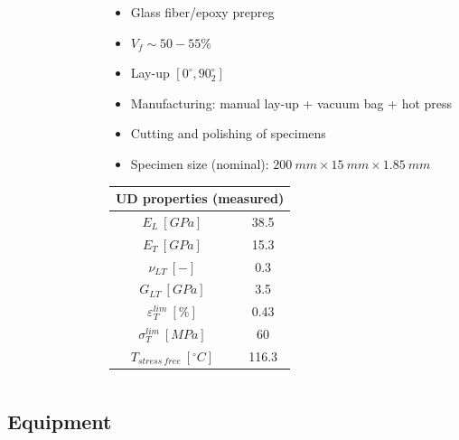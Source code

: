 \documentclass[first,firstsupp,lastsupp,last,hyperref,table]{ETHclass}
\begin{document}
\begin{frame}
\begin{columns}[c]
\begin{column}{0.5\textwidth}
\begin{figure}
\end{figure}
\end{column}
\begin{column}{0.5\textwidth}
\centering
\scriptsize
\begin{itemize}[label=]
\item Glass fiber/epoxy prepreg
\item $V_{f}\sim50-55\%$
\item Lay-up $\left[0^{\circ},90^{\circ}_{2}\right]$
\item Manufacturing: manual lay-up + vacuum bag + hot press
\item Cutting and polishing of specimens
\item Specimen size (nominal): $200\ mm\times15\ mm\times1.85\ mm$
\end{itemize}
\vspace{-0.25cm}
\begin{table}
\centering
\scriptsize
\begin{tabular}{cc}
\multicolumn{2}{c}{UD properties (measured)}\\
\midrule
$E_{L}\ \left[GPa\right]$&38.5\\
$E_{T}\ \left[GPa\right]$&15.3\\
$\nu_{LT}\ \left[-\right]$&0.3\\
$G_{LT}\ \left[GPa\right]$&3.5\\
$\varepsilon^{lim}_{T}\ \left[\%\right]$&0.43\\
$\sigma^{lim}_{T}\ \left[MPa\right]$&60\\
$T_{stress\ free}\ \left[^{\circ}C\right]$&116.3\\
\end{tabular}
\end{table}
\end{column}
\end{columns}
\end{frame}

\subsection{Equipment}
\end{document}

